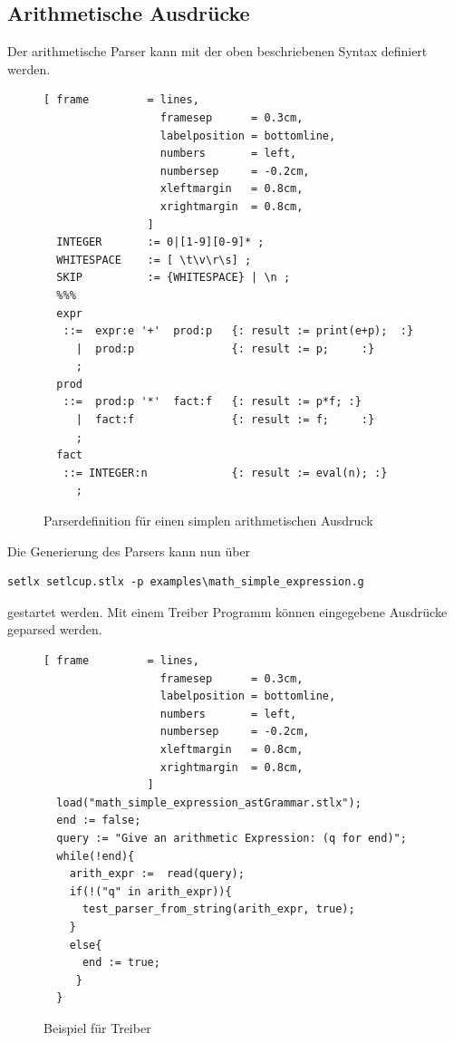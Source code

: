 \subsection{Arithmetische Ausdrücke}
Der arithmetische Parser  kann mit der oben beschriebenen Syntax definiert werden.
\begin{figure}[!ht]
\begin{Verbatim}[ frame         = lines, 
                  framesep      = 0.3cm, 
                  labelposition = bottomline,
                  numbers       = left,
                  numbersep     = -0.2cm,
                  xleftmargin   = 0.8cm,
                  xrightmargin  = 0.8cm,
                ]
  INTEGER       := 0|[1-9][0-9]* ;
  WHITESPACE    := [ \t\v\r\s] ;
  SKIP          := {WHITESPACE} | \n ;
  %%%
  expr 
   ::=  expr:e '+'  prod:p   {: result := print(e+p);  :} 
     |  prod:p               {: result := p;     :}
     ;
  prod 
   ::=  prod:p '*'  fact:f   {: result := p*f; :}
     |  fact:f               {: result := f;     :}
     ;
  fact 
   ::= INTEGER:n             {: result := eval(n); :} 
     ;
\end{Verbatim}
\caption{Parserdefinition für einen simplen arithmetischen Ausdruck}
\label{fig:example_arithmetic_grammer}
\end{figure}
%
Die Generierung des Parsers kann nun über
\begin{Verbatim}
setlx setlcup.stlx -p examples\math_simple_expression.g
\end{Verbatim}
gestartet werden.
Mit einem Treiber Programm können eingegebene Ausdrücke geparsed werden.
\begin{figure}[!htb]
\begin{Verbatim}[ frame         = lines, 
                  framesep      = 0.3cm, 
                  labelposition = bottomline,
                  numbers       = left,
                  numbersep     = -0.2cm,
                  xleftmargin   = 0.8cm,
                  xrightmargin  = 0.8cm,
                ]
  load("math_simple_expression_astGrammar.stlx");
  end := false;
  query := "Give an arithmetic Expression: (q for end)";
  while(!end){
    arith_expr :=  read(query);
    if(!("q" in arith_expr)){
      test_parser_from_string(arith_expr, true);
    }
    else{
      end := true;
     }
  }
\end{Verbatim}
\caption{Beispiel für Treiber}
\label{fig:simple_arith_driver}
\end{figure}
